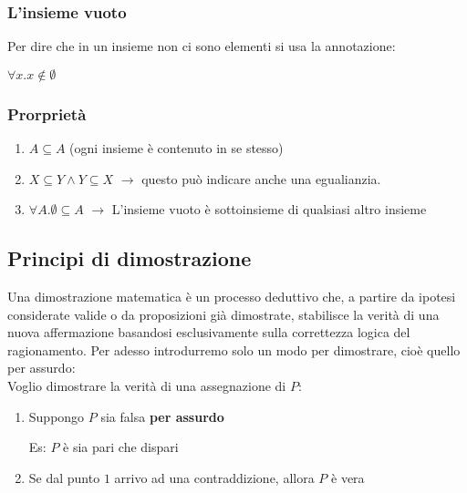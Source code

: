 \documentclass[article,12pt]{book}
\begin{document}
\begin{enumerate}
    \subsubsection{L'insieme vuoto}
        Per dire che in un insieme non ci sono elementi si usa la annotazione: 
        \begin{center}
            \(\forall x. x \notin \emptyset \)
        \end{center}
        \subsubsection{Prorprietà}
        \begin{enumerate}
            \item \( A \subseteq A \) (ogni insieme è contenuto in se stesso)
            \item \( X \subseteq Y \land Y \subseteq X \) \(\rightarrow\) questo può indicare anche una egualianzia.
            \item \(\forall A. \emptyset \subseteq A\) \(\rightarrow\) L'insieme vuoto è sottoinsieme di qualsiasi altro insieme
        \end{enumerate}
    \subsection{Principi di dimostrazione}
Una dimostrazione matematica è un processo deduttivo che, a partire da ipotesi considerate valide o da proposizioni già dimostrate, stabilisce la verità di una nuova affermazione basandosi esclusivamente sulla correttezza logica del ragionamento.
Per adesso introdurremo solo un modo per dimostrare, cioè quello per assurdo:
    \\[1ex]
Voglio dimostrare la verità di una assegnazione di $P$:
    \begin{enumerate}
        \item Suppongo $P$ sia falsa \textbf{per assurdo}
        \begin{center}
            Es: $P$ è sia pari che dispari
        \end{center}
        \item Se dal punto $1$ arrivo ad una contraddizione, allora $P$ è vera
    \end{enumerate}

\end{enumerate}
\end{document}

